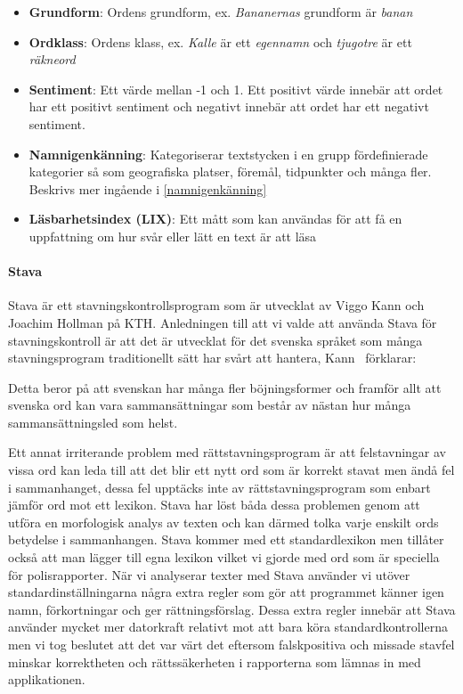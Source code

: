 \documentclass[swedish]{maucsthesis}
\begin{document}
\begin{itemize}
\item \textbf{Grundform}: Ordens grundform, ex. \textit{Bananernas} grundform är
  \textit{banan}
\item \textbf{Ordklass}: Ordens klass, ex. \textit{Kalle} är ett
  \textit{egennamn} och \textit{tjugotre} är ett \textit{räkneord}
\item \textbf{Sentiment}: Ett värde mellan -1 och 1. Ett positivt värde innebär att ordet har ett positivt sentiment och negativt innebär att ordet har ett negativt sentiment.
\item \textbf{Namnigenkänning}: Kategoriserar textstycken i en grupp
  fördefinierade kategorier så som geografiska platser, föremål, tidpunkter och
  många fler. Beskrivs mer ingående i \cref{namnigenkänning}
\item \textbf{Läsbarhetsindex (LIX)}: Ett mått som kan användas för att få en
  uppfattning om hur svår eller lätt en text är att läsa
\end{itemize}

\paragraph*{Stava}\label{stava}
Stava är ett stavningskontrollsprogram som är utvecklat av Viggo Kann och
Joachim Hollman på KTH. Anledningen till att vi valde att använda Stava för
stavningskontroll är att det är utvecklat för det svenska språket som många
stavningsprogram traditionellt sätt har svårt att hantera, Kann~\cite{kann:1997}
förklarar:

\begin{displayquote}
  Detta beror på att svenskan har många fler böjningsformer och framför allt att
  svenska ord kan vara sammansättningar som består av nästan hur många
  sammansättningsled som helst.
\end{displayquote}

Ett annat irriterande problem med rättstavningsprogram är att felstavningar av
vissa ord kan leda till att det blir ett nytt ord som är korrekt stavat men ändå
fel i sammanhanget, dessa fel upptäcks inte av rättstavningsprogram som enbart
jämför ord mot ett lexikon. Stava har löst båda dessa problemen genom att utföra
en morfologisk analys av texten och kan därmed tolka varje enskilt ords
betydelse i sammanhangen. Stava kommer med ett standardlexikon men tillåter
också att man lägger till egna lexikon vilket vi gjorde med ord som är speciella
för polisrapporter. När vi analyserar texter med Stava använder vi utöver
standardinställningarna några extra regler som gör att programmet känner igen
namn, förkortningar och ger rättningsförslag. Dessa extra regler innebär att
Stava använder mycket mer datorkraft relativt mot att bara köra
standardkontrollerna men vi tog beslutet att det var värt det eftersom
falskpositiva och missade stavfel minskar korrektheten och rättssäkerheten i
rapporterna som lämnas in med applikationen.
\end{document}
